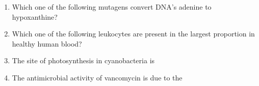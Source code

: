 \documentclass[journal,12pt,onecolumn]{IEEEtran}
\theoremstyle{remark}
\begin{document}
\begin{enumerate}
    \item Which one of the following mutagens convert DNA's adenine to hypoxanthine?

    \hfill{}

    \begin{enumerate}
    \end{enumerate}

    \item Which one of the following leukocytes are present in the largest proportion in healthy human blood?

    \hfill{}

    \begin{enumerate}
    \end{enumerate}

    \item The site of photosynthesis in cyanobacteria is

    \hfill{}

    \begin{enumerate}
    \end{enumerate}

    \item The antimicrobial activity of vancomycin is due to the

    \hfill{}


\end{enumerate}
\end{document}
